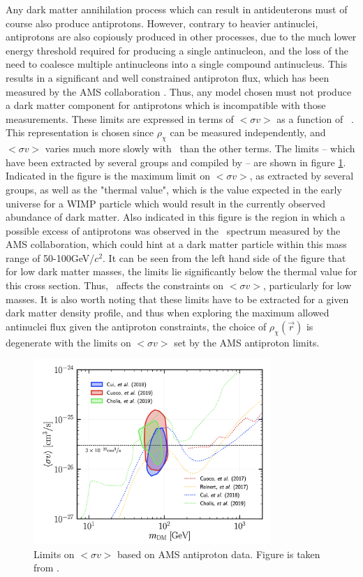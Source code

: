 Any dark matter annihilation process which can result in antideuterons must of course also produce antiprotons. However, contrary to heavier antinuclei, antiprotons are also copiously produced in other processes, due to the much lower energy threshold required for producing a single antinucleon, and the loss of the need to coalesce multiple antinucleons into a single compound antinucleus. This results in a significant and well constrained antiproton flux, which has been measured by the AMS collaboration \cite{}. Thus, any model chosen must not produce a dark matter component for antiprotons which is incompatible with those measurements. These limits are expressed in terms of $<\sigma v>$ as a function of \dmm\ . This representation is chosen since $\rho_\chi$ can be measured independently, and $<\sigma v>$ varies much more slowly with \dmm\ than the other terms. The limits -- which have been extracted by several groups \cite{} and compiled by \cite{}-- are shown in figure \ref{fig:DMSigmaVLimits}. Indicated in the figure is the maximum limit on $<\sigma v>$, as extracted by several groups, as well as the "thermal value", which is the value expected in the early universe for a WIMP particle which would result in the currently observed abundance of dark matter. Also indicated in this figure is the region in which a possible excess of antiprotons was observed in the \pbar\ spectrum measured by the AMS collaboration, which could hint at a dark matter particle within this mass range of 50-100GeV/$c^2$. It can be seen from the left hand side of the figure that for low dark matter masses, the limits lie significantly below the thermal value for this cross section. Thus, \dmm\ affects the constraints on  $<\sigma v>$, particularly for low masses. It is also worth noting that these limits have to be extracted for a given dark matter density profile, and thus when exploring the maximum allowed antinuclei flux given the antiproton constraints, the choice of $\rho_\chi(\vec{r})$ is degenerate with the limits on $<\sigma v>$ set by the AMS antiproton limits.\\

\begin{figure}[hbtp]
    \centering
    \includegraphics[width=0.8\textwidth]{figures/PbarLimitsAMS.png}
    \caption{Limits on  $<\sigma v>$ based on AMS antiproton data. Figure is taken from \cite{}.}
    \label{fig:DMSigmaVLimits}
\end{figure}

